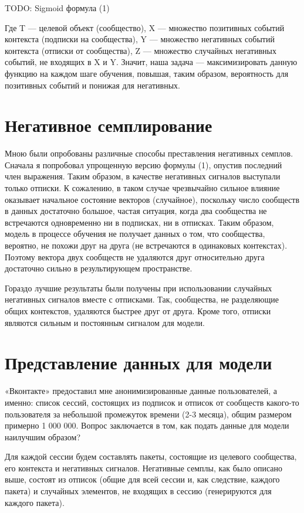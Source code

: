 \documentclass[times,specification,annotation]{itmo-student-thesis}
\begin{document}
TODO: Sigmoid формула (1)

Где T --- целевой объект (сообщество), X --- множество позитивных событий
контекста (подписки на сообщества), Y --- множество негативных событий
контекста (отписки от сообщества), Z --- множество случайных негативных
событий, не входящих в X и Y. Значит, наша задача --- максимизировать данную
функцию на каждом шаге обучения, повышая, таким образом, вероятность для
позитивных событий и понижая для негативных.

\section{ Негативное семплирование}
Мною были опробованы различные способы преставления негативных
семплов. Сначала я попробовал упрощенную версию формулы (1), опустив
последний член выражения. Таким образом, в качестве негативных сигналов
выступали только отписки. К сожалению, в таком случае чрезвычайно сильное
влияние оказывает начальное состояние векторов (случайное), поскольку число
сообществ в данных достаточно большое, частая ситуация, когда два сообщества
не встречаются одновременно ни в подписках, ни в отписках. Таким образом,
модель в процессе обучения не получает данных о том, что сообщества, вероятно,
не похожи друг на друга (не встречаются в одинаковых контекстах). Поэтому
вектора двух сообществ не удаляются друг относительно друга достаточно сильно
в результирующем пространстве.

Гораздо лучшие результаты были получены при использовании случайных
негативных сигналов вместе с отписками. Так, сообщества, не разделяющие общих
контекстов, удаляются быстрее друг от друга. Кроме того, отписки являются
сильным и постоянным сигналом для модели.

\section{Представление данных для модели}
«Вконтакте» предоставил мне анонимизированные данные пользователей, а
именно: список сессий, состоящих из подписок и отписок от сообществ какого-то
пользователя за небольшой промежуток времени (2-3 месяца), общим размером
примерно 1 000 000. Вопрос заключается в том, как подать данные для модели
наилучшим образом?

Для каждой сессии будем составлять пакеты, состоящие из целевого
сообщества, его контекста и негативных сигналов. Негативные семплы, как было
описано выше, состоят из отписок (общие для всей сессии и, как следствие,
каждого пакета) и случайных элементов, не входящих в сессию (генерируются для
каждого пакета).
\end{document}
